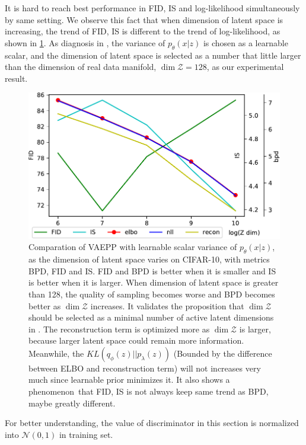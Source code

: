 It is hard to reach best performance in FID, IS and log-likelihood simultaneously by same setting. We observe this fact that when dimension of latent space is increasing, the trend of FID, IS is different to the trend of log-likelihood, as shown in \cref{fig:fid_different_dim}. As diagnosis in \cite{dai2019diagnosing}, the variance of $p_\theta(x|z)$ is chosen as a learnable scalar, and the dimension of latent space is selected as a number that little larger than the dimension of real data manifold, $\dim \mathcal{Z} = 128$, as our experimental result.  

\begin{figure}[tb]
	\centering
	\includegraphics[width=1.0\columnwidth]{../dist.strip/z_dim}
	\caption{
	Comparation of VAEPP with learnable scalar variance of $p_\theta(x|z)$, as the dimension of latent space varies on CIFAR-10, with metrics BPD, FID and IS. FID and BPD is better when it is smaller and IS is better when it is larger. When dimension of latent space is greater than 128, the quality of sampling becomes worse and BPD becomes better as $\dim \mathcal{Z}$ increases. It validates the proposition that $\dim \mathcal{Z}$ should be selected as a minimal number of active latent dimensions in \protect\cite{dai2019diagnosing}. The reconstruction term is optimized more as $\dim \mathcal{Z}$ is larger, because larger latent space could remain more information. Meanwhile, the $KL(q_\phi(z)||p_\lambda(z))$ (Bounded by the difference between ELBO and reconstruction term) will not increases very much since learnable prior minimizes it. It also shows a phenomenon that FID, IS is not always keep same trend as BPD, maybe greatly different. 
	}
	\label{fig:fid_different_dim}
\end{figure}

For better understanding, the value of discriminator in this section is normalized into $\mathcal{N}(0, 1)$ in training set.

